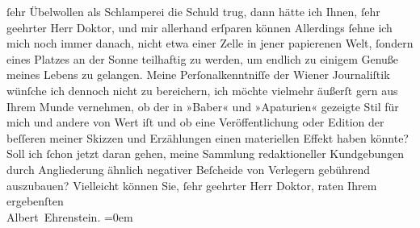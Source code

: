 \begin{ledgroupsized}[t]{13cm}
                    ſehr Übelwollen als Schlamperei die Schuld trug, dann hätte ich Ihnen, ſehr
                    geehrter Herr Doktor, und mir allerhand erſparen können{\dotsfour} Allerdings ſehne ich mich noch immer danach, nicht etwa einer Zelle
                    in jener papierenen Welt, ſondern eines Platzes an der Sonne teilhaftig zu
                    werden, um endlich zu einigem Genuße meines Lebens zu gelangen. Meine
                    Perſonalkenntniſſe der Wiener Journaliſtik
                    wünſche ich dennoch nicht zu bereichern, ich möchte vielmehr äußerſt gern aus
                    Ihrem Munde vernehmen, ob der in »Baber« und
                        »Apaturien« gezeigte Stil für mich und
                    andere von Wert iſt und ob eine Veröffentlichung oder Edition der beſſeren
                    meiner Skizzen und Erzählungen einen materiellen Effekt haben könnte? Soll ich
                    ſchon jetzt daran gehen, meine Sammlung redaktioneller Kundgebungen durch
                    Angliederung ähnlich negativer Beſcheide von Verlegern gebührend auszubauen?
                    Vielleicht können Sie, ſehr geehrter Herr Doktor, raten\pend
           \pstart
           Ihrem ergebenſten{\\[\baselineskip]}\spacefill\mbox{Albert Ehrenstein.}\pend
           \leftskip=0em{}\endnumbering{}\end{ledgroupsized}  \newcommand{\dateiname}{L01880}\newcommand{\titel}{Albert Ehrenstein an Arthur Schnitzler, 17. 10. 1909}\newcommand{\editorInnen}{Martin Anton Müller und Gerd-Hermann Susen}
      